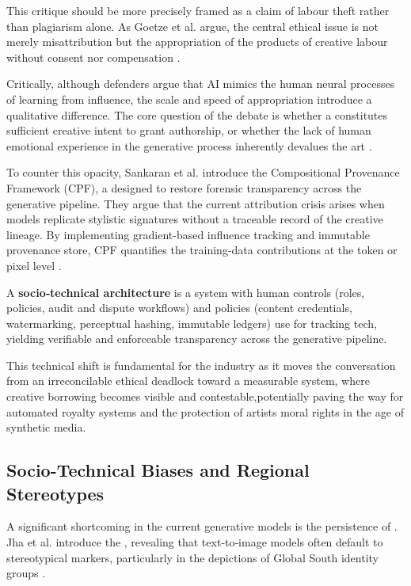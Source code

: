 \documentclass[9pt,a4paper,twocolumn,twoside]{rho-class/rho}
\begin{document}
        This critique should be more precisely framed as a claim of labour theft rather than plagiarism alone. As Goetze et al. argue, the central ethical issue is not merely misattribution but the appropriation of the products of creative labour without consent nor compensation \cite{goetze}.

        Critically, although defenders argue that AI mimics the human neural processes of learning from influence, the scale and speed of appropriation introduce a qualitative difference. The core question of the debate is whether a  constitutes sufficient creative intent to grant authorship, or whether the lack of human emotional experience in the generative process inherently devalues the art \cite{panera}.

        To counter this  opacity, Sankaran et al. introduce the Compositional Provenance Framework (CPF), a   designed to restore forensic transparency across the generative pipeline. They argue that the current attribution crisis arises when models replicate stylistic signatures without a traceable record of the creative lineage. By implementing gradient-based influence tracking and immutable provenance store, CPF quantifies the training-data contributions at the token or pixel level \cite{sankaran}.

        \begin{note}
            A \textbf{socio‑technical architecture} is a system with human controls (roles, policies, audit and dispute workflows) and policies (content credentials, watermarking, perceptual hashing, immutable ledgers) use for tracking tech, yielding verifiable and enforceable transparency across the generative pipeline.
        \end{note}

        This technical shift is fundamental for the industry as it moves the conversation from an irreconcilable ethical deadlock toward a measurable system, where creative borrowing becomes visible and contestable,potentially paving the way for automated royalty systems and the protection of artists moral rights in the age of synthetic media.

    \subsection{Socio-Technical Biases and Regional Stereotypes}

		A significant shortcoming in the current generative models is the persistence of . Jha et al. introduce the , revealing that text‑to‑image models often default to stereotypical markers, particularly  in the depictions of Global South identity groups \cite{jha}.
\end{document}

